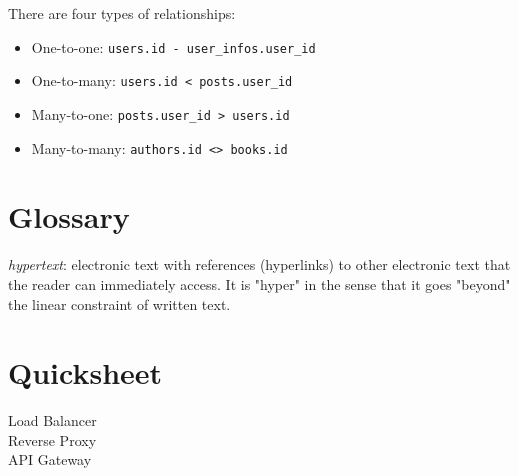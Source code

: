 \documentclass[12pt, titlepage]{article}
\begin{document}
There are four types of relationships:
\begin{itemize}
  \item One-to-one: \texttt{users.id - user\_infos.user\_id}
  \item One-to-many: \texttt{users.id < posts.user\_id}
  \item Many-to-one: \texttt{posts.user\_id > users.id}
  \item Many-to-many: \texttt{authors.id <> books.id}
\end{itemize}

\section{Glossary}

\textit{hypertext}: electronic text with references (hyperlinks) to other electronic text that the reader can immediately access. It is "hyper" in the sense that it goes "beyond" the linear constraint of written text.

\newpage
\section{Quicksheet}

Load Balancer \\
Reverse Proxy \\
API Gateway \\

\newpage
{} %
\end{document}
